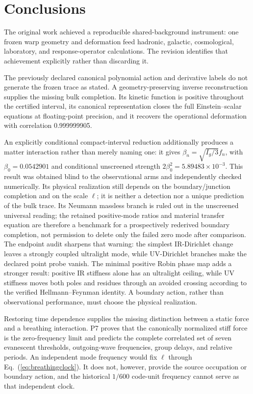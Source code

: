 \documentclass[10pt]{article}
\begin{document}
\section{Conclusions}

The original work achieved a reproducible shared-background instrument: one
frozen warp geometry and deformation feed hadronic, galactic, cosmological,
laboratory, and response-operator calculations.  The revision identifies that
achievement explicitly rather than discarding it.

The previously declared canonical polynomial action and derivative labels do
not generate the frozen trace as stated.  A geometry-preserving inverse
reconstruction supplies the missing bulk completion.  Its kinetic function is
positive throughout the certified interval, its canonical representation
closes the full Einstein--scalar equations at floating-point precision, and it
recovers the operational deformation with correlation 0.999999905.

An explicitly conditional compact-interval reduction additionally produces a
matter interaction rather than merely naming one: it gives
$\beta_n=\sqrt{I_g/3}f_n$, with $\beta_0=0.0542901$ and conditional unscreened
strength $2\beta_0^2=5.89483\times10^{-3}$.  This result was obtained blind to
the observational arms and independently checked numerically.  Its physical
realization still depends on the boundary/junction completion and on the scale
$\ell$; it is neither a detection nor a unique prediction of the bulk trace.
Its Neumann massless branch is ruled out in the unscreened universal reading;
the retained positive-mode ratios and material transfer equation are therefore
a benchmark for a prospectively rederived boundary completion, not permission
to delete only the failed zero mode after comparison.
The endpoint audit sharpens that warning: the simplest IR-Dirichlet change
leaves a strongly coupled ultralight mode, while UV-Dirichlet branches make the
declared point probe vanish.  The minimal positive Robin phase map adds a stronger
result: positive IR stiffness alone has an ultralight ceiling, while UV
stiffness moves both poles and residues through an avoided crossing according
to the verified Hellmann--Feynman identity.  A boundary action, rather than
observational performance, must choose the physical realization.

Restoring time dependence supplies the missing distinction between a static
force and a breathing interaction.  P7 proves that the canonically normalized
stiff force is the zero-frequency limit and predicts the complete correlated
set of seven evanescent thresholds, outgoing-wave frequencies, group delays,
and relative periods.  An independent
mode frequency would fix $\ell$ through Eq.~(\ref{eq:breathingclock}).  It does
not, however, provide the source occupation or boundary action, and the
historical $1/600$ code-unit frequency cannot serve as that independent clock.
\end{document}
